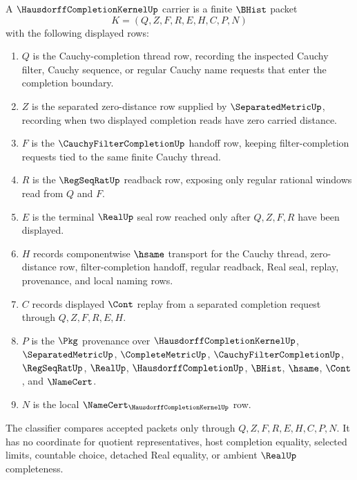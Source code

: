\begin{definition}
\label{def:hausdorff-completion-kernel-carrier}
A $\HausdorffCompletionKernelUp$ carrier is a finite $\BHist$ packet
$$
K=(Q,Z,F,R,E,H,C,P,N)
$$
with the following displayed rows:
\begin{enumerate}
\item $Q$ is the Cauchy-completion thread row, recording the inspected Cauchy filter, Cauchy sequence, or regular Cauchy name requests that enter the completion boundary.
\item $Z$ is the separated zero-distance row supplied by $\SeparatedMetricUp$, recording when two displayed completion reads have zero carried distance.
\item $F$ is the $\CauchyFilterCompletionUp$ handoff row, keeping filter-completion requests tied to the same finite Cauchy thread.
\item $R$ is the $\RegSeqRatUp$ readback row, exposing only regular rational windows read from $Q$ and $F$.
\item $E$ is the terminal $\RealUp$ seal row reached only after $Q,Z,F,R$ have been displayed.
\item $H$ records componentwise $\hsame$ transport for the Cauchy thread, zero-distance row, filter-completion handoff, regular readback, Real seal, replay, provenance, and local naming rows.
\item $C$ records displayed $\Cont$ replay from a separated completion request through $Q,Z,F,R,E,H$.
\item $P$ is the $\Pkg$ provenance over $\HausdorffCompletionKernelUp$, $\SeparatedMetricUp$, $\CompleteMetricUp$, $\CauchyFilterCompletionUp$, $\RegSeqRatUp$, $\RealUp$, $\HausdorffCompletionUp$, $\BHist$, $\hsame$, $\Cont$, and $\NameCert$.
\item $N$ is the local $\NameCert_{\HausdorffCompletionKernelUp}$ row.
\end{enumerate}
The classifier compares accepted packets only through $Q,Z,F,R,E,H,C,P,N$. It has no coordinate for quotient representatives, host completion equality, selected limits, countable choice, detached Real equality, or ambient $\RealUp$ completeness.
\end{definition}

